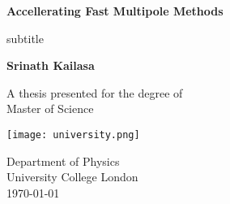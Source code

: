 \begin{titlepage}
    \begin{center}
        \vspace*{1cm}
        
        \Huge
        \textbf{Accellerating Fast Multipole Methods}
        
        \Large
        \vspace{0.5cm}
        subtitle
             
        \vfill
 
        \textbf{Srinath Kailasa}
 
        \vspace{5cm}
             
        A thesis presented for the degree of\\
        Master of Science
             
        \vspace{0.8cm}
      
        \texttt{[image: university.png]}
        
        \large
        Department of Physics\\
        University College London\\
        \today
             
    \end{center}
 \end{titlepage}
